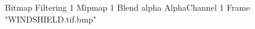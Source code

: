 {Bitmap
	{Filtering 1}
	{Mipmap 1}
	{Blend alpha}
	{AlphaChannel 1}
	{Frame "WINDSHIELD.tif.bmp"}
}
